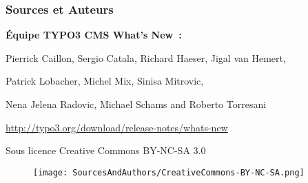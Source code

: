 \begin{frame}[fragile]
	\frametitle{Sources et Auteurs}

	\vspace{-0.6cm}

	\centerline{\textbf{Équipe TYPO3 CMS What's New~:}}

	\begin{center}
		\centerline{Pierrick Caillon, Sergio Catala, Richard Haeser, Jigal van Hemert,}
		\centerline{Patrick Lobacher, Michel Mix, Sinisa Mitrovic,}
		\centerline{Nena Jelena Radovic, Michael Schams and Roberto Torresani}
	\end{center}

	\vspace{0.4cm}

	\smaller\begin{center}\url{http://typo3.org/download/release-notes/whats-new}\end{center}\normalsize

	\vspace{1cm}

	\smaller\begin{center}Sous licence Creative Commons BY-NC-SA 3.0\end{center}\normalsize
	\begin{figure}\vspace*{-0.4cm}
		\texttt{[image: SourcesAndAuthors/CreativeCommons-BY-NC-SA.png]}
	\end{figure}

\end{frame}

